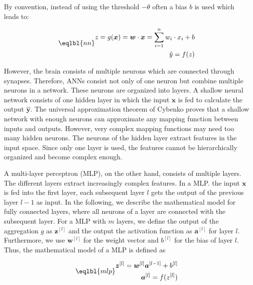 By convention, instead of using the threshold \(- \theta\) often a bias \(b\) is used which leads to:

\begin{equation}\eqlbl{nn}
	\begin{aligned}
		z = g(\boldsymbol{x}) = \boldsymbol{w} \cdot \boldsymbol{x} = \sum_{i=1}^{n}w_i \cdot x_i + b\\
		\hat{y} = f(z)
	\end{aligned}
\end{equation}

However, the brain consists of multiple neurons which are connected through synapses.
Therefore, ANNs consist not only of one neuron but combine multiple neurons in a network. 
These neurons are organized into layers.
A shallow neural network consists of one hidden layer in which the input \(\boldsymbol{x}\) is fed to calculate the output \(\boldsymbol{\hat{y}}\).
The universal approximation theorem of Cybenko  proves that a shallow network with enough neurons can approximate any mapping function between inputs and outputs.
However, very complex mapping functions may need too many hidden neurons.
The neurons of the hidden layer extract features in the input space.
Since only one layer is used, the features cannot be hierarchically organized and become complex enough.

A multi-layer perceptron (MLP), on the other hand, consists of multiple layers.
The different layers extract increasingly complex features.
In a MLP. the input \(\boldsymbol{x}\) is fed into the first layer, each subsequent layer \(l\) gets the output of the previous layer \(l-1\) as input.
In the following, we describe the mathematical model for fully connected layers, where all neurons of a layer are connected with the subsequent layer.
For a MLP with \(m\) layers, we define the output of the aggregation \(g\) as \(\boldsymbol{z}^{[l]}\) and the output the activation function as \(\boldsymbol{a}^{[l]}\) for layer \(l\).
Furthermore, we use \(\boldsymbol{w}^{[l]}\) for the weight vector and \(b^{[l]}\) for the bias of layer \(l\).
Thus, the mathematical model of a MLP is defined as

\begin{equation}\eqlbl{mlp}
	\begin{aligned}
		\boldsymbol{z}^{[l]} = \boldsymbol{w}^{[l]}\boldsymbol{a}^{[l-1]} + b^{[l]}\\
		\boldsymbol{a}^{[l]} = f({z}^{[l]})
	\end{aligned}
\end{equation}


